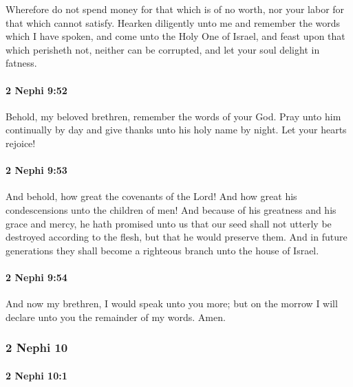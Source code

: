 			Wherefore do not spend money for that which is of no worth,
			nor your labor for that which cannot satisfy.
			Hearken diligently unto me
			and remember the words which I have spoken,
			and come unto the Holy One of Israel,
			and feast upon that which perisheth not, neither can be corrupted,
			and let your soul delight in fatness.

		\paragraph{2 Nephi 9:52} %
			\label{2NEPHI-9-52}

			Behold, my beloved brethren, remember the words of your God.
			Pray unto him continually by day
			and give thanks unto his holy name by night.
			Let your hearts rejoice!

		\paragraph{2 Nephi 9:53} %
			\label{2NEPHI-9-53}

			And behold, how great the covenants of the Lord!
			And how great his condescensions unto the children of men!
			And because of his greatness and his grace and mercy,
			he hath promised unto us
			that our seed shall not utterly be destroyed according to the flesh,
			but that he would preserve them.
			And in future generations they shall become
			a righteous branch unto the house of Israel.

		\paragraph{2 Nephi 9:54} %
			\label{2NEPHI-9-54}

			And now my brethren, I would speak unto you more;
			but on the morrow I will declare unto you the remainder of my words.
			Amen.

	\subsubsection{2 Nephi 10} %
		\label{2NEPHI-10}
		
		\paragraph{2 Nephi 10:1} %
			\label{2NEPHI-10-1}

